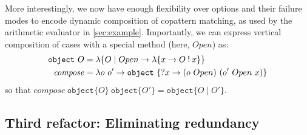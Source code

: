 \documentclass[sigplan,screen]{acmart}
\begin{document}
More interestingly, we now have enough flexibility over options and their
failure modes to encode dynamic composition of copattern matching, as used by
the arithmetic evaluator in \cref{sec:example}.  Importantly, we can express
vertical composition of cases with a special method (here, $\mathit{Open}$) as:
\begin{align*}
  \mathtt{object}~O
  &=
  \lambda \{ O \mid Open \to \lambda\{x \to O \mathbin{!} x\} \}
  \\
  \mathit{compose}
  &=
  \lambda o ~ o' \to
  \mathtt{object}~\{\mathbin{?} x \to (o~Open)~(o'~Open ~ x)\}
\end{align*}
so that
$\mathit{compose}~\mathtt{object}\{O\}~\mathtt{object}\{O'\} =
\mathtt{object}\{O \mid O'\}$.


\subsection{Third refactor: Eliminating redundancy}

\end{document}
